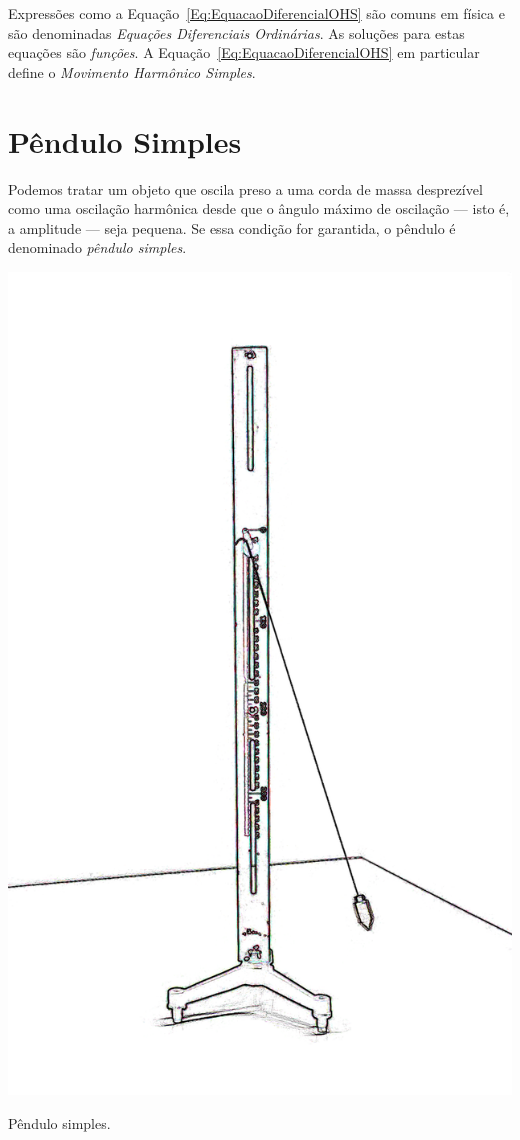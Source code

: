 Expressões como a Equação~\eqref{Eq:EquacaoDiferencialOHS} são comuns em física e são denominadas \emph{Equações Diferenciais Ordinárias}. As soluções para estas equações são \emph{funções}. A Equação~\eqref{Eq:EquacaoDiferencialOHS} em particular define o \emph{Movimento Harmônico Simples}.

\section{Pêndulo Simples}

Podemos tratar um objeto que oscila preso a uma corda de massa desprezível como uma oscilação harmônica desde que o ângulo máximo de oscilação --- isto é, a amplitude --- seja pequena. Se essa condição for garantida, o pêndulo é denominado \emph{pêndulo simples}.

\begin{marginfigure}
	\centering
	\includegraphics[width=\textwidth]{Ilustrations/Pendulo_simples.png}
	\caption{Pêndulo simples.}
\end{marginfigure}


